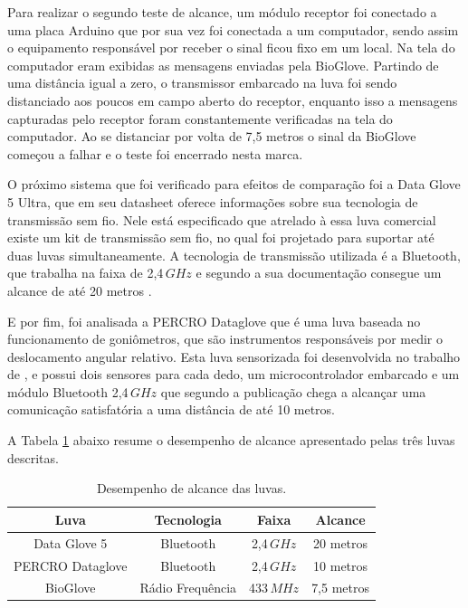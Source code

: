 \documentclass[
	12pt,				%
	openright,			%
	oneside,			%
	a4paper,			%
	english,			%
	brazil				%
	]{abntex2}
\begin{document}
		Para realizar o segundo teste de alcance, um módulo receptor foi conectado a uma placa Arduino que por sua vez foi conectada a um computador, sendo assim o equipamento responsável por receber o sinal ficou fixo em um local. Na tela do computador eram exibidas as mensagens enviadas pela BioGlove. Partindo de uma distância igual a zero, o transmissor embarcado na luva foi sendo distanciado aos poucos em campo aberto do receptor, enquanto isso a mensagens capturadas pelo receptor foram constantemente verificadas na tela do computador. Ao se distanciar por volta de 7,5 metros o sinal da BioGlove começou a falhar e o teste foi encerrado nesta marca. 

			O próximo sistema que foi verificado para efeitos de comparação foi a Data Glove 5 Ultra, que em seu datasheet oferece informações sobre sua tecnologia de transmissão sem fio. Nele está especificado que atrelado à essa luva comercial existe um kit de transmissão sem fio, no qual foi projetado para suportar até duas luvas simultaneamente. A tecnologia de transmissão utilizada é a Bluetooth, que trabalha na faixa de 2,4$\,GHz$ e segundo a sua documentação consegue um alcance de até 20 metros \cite{5DT-ultra}.

			E por fim, foi analisada a PERCRO Dataglove que é uma luva baseada no funcionamento de goniômetros, que são instrumentos responsáveis por medir o deslocamento angular relativo. Esta luva sensorizada foi desenvolvida no trabalho de \cite{rodriguez2007goniometric}, e possui dois sensores para cada dedo, um microcontrolador embarcado e um módulo Bluetooth 2,4$\,GHz$ que segundo a publicação chega a alcançar uma comunicação satisfatória a uma distância de até 10 metros.


			A Tabela \ref{Tab:wifi-range} abaixo resume o desempenho de alcance apresentado pelas três luvas descritas.

		\begin{table}[H]
  	\centering
		\caption{Desempenho de alcance das luvas.}
    \begin{tabular}{c|c|c|c}
      \midrule
			Luva 						& Tecnologia			&	Faixa		& Alcance		\\
      \midrule                                            					
			Data Glove 5		& Bluetooth				& 2,4$\,GHz$	& 20 metros	\\
			PERCRO Dataglove& Bluetooth				& 2,4$\,GHz$	& 10 metros	\\
			BioGlove				& Rádio Frequência& 433$\,MHz$	&	7,5 metros\\	
      \midrule
    \end{tabular}
		\label{Tab:wifi-range}
		\end{table}
\end{document}
